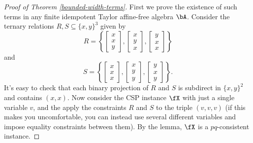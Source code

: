 \begin{proof}[Proof of Theorem \ref{bounded-width-terms}] First we prove the existence of such terms in any finite idempotent Taylor affine-free algebra $\bA$. Consider the ternary relations $R,S \subseteq \{x,y\}^3$ given by
\[
R = \left\{\begin{bmatrix} x\\ x\\ y\end{bmatrix}, \begin{bmatrix} x\\ y\\ x\end{bmatrix}, \begin{bmatrix} y\\ x\\ x\end{bmatrix}\right\}
\]
and
\[
S = \left\{\begin{bmatrix} x\\ x\\ x\end{bmatrix}, \begin{bmatrix} x\\ y\\ y\end{bmatrix}, \begin{bmatrix} y\\ x\\ y\end{bmatrix}\right\}.
\]
It's easy to check that each binary projection of $R$ and $S$ is subdirect in $\{x,y\}^2$ and contains $(x,x)$. Now consider the CSP instance $\fX$ with just a single variable $v$, and the apply the constraints $R$ and $S$ to the triple $(v,v,v)$ (if this makes you uncomfortable, you can instead use several different variables and impose equality constraints between them). By the lemma, $\fX$ is a $pq$-consistent instance.


\end{proof}
